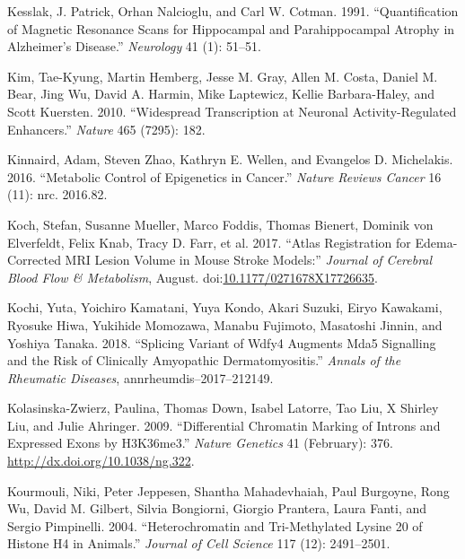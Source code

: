 \documentclass[onehalf,12pt]{beavtex}
\begin{document}
  \hypertarget{ref-KesslakQuantificationmagneticresonance1991}{}
  Kesslak, J. Patrick, Orhan Nalcioglu, and Carl W. Cotman. 1991.
  ``Quantification of Magnetic Resonance Scans for Hippocampal and
  Parahippocampal Atrophy in Alzheimer's Disease.'' \emph{Neurology} 41
  (1): 51--51.
  
  \hypertarget{ref-KimWidespreadtranscriptionneuronal2010}{}
  Kim, Tae-Kyung, Martin Hemberg, Jesse M. Gray, Allen M. Costa, Daniel M.
  Bear, Jing Wu, David A. Harmin, Mike Laptewicz, Kellie Barbara-Haley,
  and Scott Kuersten. 2010. ``Widespread Transcription at Neuronal
  Activity-Regulated Enhancers.'' \emph{Nature} 465 (7295): 182.
  
  \hypertarget{ref-KinnairdMetaboliccontrolepigenetics2016}{}
  Kinnaird, Adam, Steven Zhao, Kathryn E. Wellen, and Evangelos D.
  Michelakis. 2016. ``Metabolic Control of Epigenetics in Cancer.''
  \emph{Nature Reviews Cancer} 16 (11): nrc. 2016.82.
  
  \hypertarget{ref-KochAtlasregistrationedemacorrected2017}{}
  Koch, Stefan, Susanne Mueller, Marco Foddis, Thomas Bienert, Dominik von
  Elverfeldt, Felix Knab, Tracy D. Farr, et al. 2017. ``Atlas Registration
  for Edema-Corrected MRI Lesion Volume in Mouse Stroke Models:''
  \emph{Journal of Cerebral Blood Flow \& Metabolism}, August.
  doi:\href{https://doi.org/10.1177/0271678X17726635}{10.1177/0271678X17726635}.
  
  \hypertarget{ref-KochiSplicingvariantWDFY42018a}{}
  Kochi, Yuta, Yoichiro Kamatani, Yuya Kondo, Akari Suzuki, Eiryo
  Kawakami, Ryosuke Hiwa, Yukihide Momozawa, Manabu Fujimoto, Masatoshi
  Jinnin, and Yoshiya Tanaka. 2018. ``Splicing Variant of Wdfy4 Augments
  Mda5 Signalling and the Risk of Clinically Amyopathic Dermatomyositis.''
  \emph{Annals of the Rheumatic Diseases}, annrheumdis--2017--212149.
  
  \hypertarget{ref-Kolasinska-ZwierzDifferentialchromatinmarking2009}{}
  Kolasinska-Zwierz, Paulina, Thomas Down, Isabel Latorre, Tao Liu, X
  Shirley Liu, and Julie Ahringer. 2009. ``Differential Chromatin Marking
  of Introns and Expressed Exons by H3K36me3.'' \emph{Nature Genetics} 41
  (February): 376. \url{http://dx.doi.org/10.1038/ng.322}.
  
  \hypertarget{ref-KourmouliHeterochromatintrimethylatedlysine2004}{}
  Kourmouli, Niki, Peter Jeppesen, Shantha Mahadevhaiah, Paul Burgoyne,
  Rong Wu, David M. Gilbert, Silvia Bongiorni, Giorgio Prantera, Laura
  Fanti, and Sergio Pimpinelli. 2004. ``Heterochromatin and Tri-Methylated
  Lysine 20 of Histone H4 in Animals.'' \emph{Journal of Cell Science} 117
  (12): 2491--2501.
  
\end{document}
